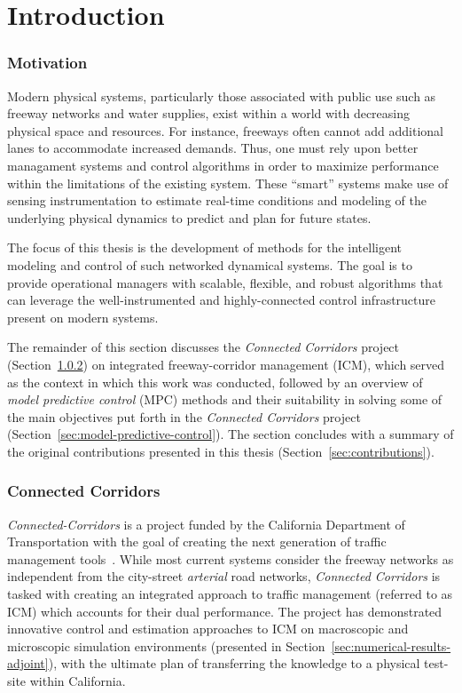 \chapter{Introduction}
\label{sec:introduction}

\subsection{Motivation}
\label{sec:motivation}


Modern physical systems, particularly those associated with public use such as freeway networks and water supplies, exist within a world with decreasing physical space and resources. For instance, freeways often cannot add additional lanes to accommodate increased demands. Thus, one must rely upon better managament systems and control algorithms in order to maximize performance within the limitations of the existing system. These ``smart'' systems make use of sensing instrumentation to estimate real-time conditions and modeling of the underlying physical dynamics to predict and plan for future states.

The focus of this thesis is the development of methods for the intelligent modeling and control of such networked dynamical systems. The goal is to provide operational managers with scalable, flexible, and robust algorithms that can leverage the well-instrumented and highly-connected control infrastructure present on modern systems. 

The remainder of this section discusses the \emph{Connected Corridors} project (Section~\ref{sec:connected-corridors}) on integrated freeway-corridor management (ICM), which served as the context in which this work was conducted, followed by an overview of \emph{model predictive control} (MPC) methods and their suitability in solving some of the main objectives put forth in the \emph{Connected Corridors} project (Section~\ref{sec:model-predictive-control}). The section concludes with a summary of the original contributions presented in this thesis (Section~\ref{sec:contributions}).

\subsection{Connected Corridors}
\label{sec:connected-corridors}

\emph{Connected-Corridors} is a project funded by the California Department of Transportation with the goal of creating the next generation of traffic management tools~\cite{connected-corridors,miller2010san}. While most current systems consider the freeway networks as independent from the city-street \emph{arterial} road networks, \emph{Connected Corridors} is tasked with creating an integrated approach to traffic management (referred to as ICM) which accounts for their dual performance. The project has demonstrated innovative control and estimation approaches to ICM on macroscopic and microscopic simulation environments (presented in Section~\ref{sec:numerical-results-adjoint}), with the ultimate plan of transferring the knowledge to a physical test-site within California.

